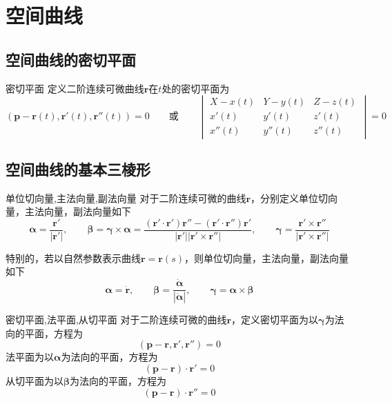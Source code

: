 \documentclass[lang = cn, scheme = chinese, thmcnt = section]{elegantbook}
\newcommand{\bs}{\boldsymbol}          %
\begin{document}
\section{空间曲线}

\subsection{空间曲线的密切平面}

\begin{definition}{密切平面}
	定义二阶连续可微曲线$\bs{r}$在$t$处的密切平面为
	$$
	(\bs{p}-\bs{r}(t),\bs{r}'(t),\bs{r}''(t))=0
	\qquad\text{或}\qquad
	\begin{vmatrix}
		X-x(t) & Y-y(t) & Z-z(t)\\
		x'(t) & y'(t) & z'(t)\\
		x''(t) & y''(t) & z''(t)
	\end{vmatrix}=0
	$$
\end{definition}

\subsection{空间曲线的基本三棱形}

\begin{definition}{单位切向量,主法向量,副法向量}
	对于二阶连续可微的曲线$\bs{r}$，分别定义单位切向量，主法向量，副法向量如下
	$$
	\bs{\alpha}=\frac{\bs{r}'}{|\bs{r}'|},\qquad
	\bs{\beta}=\bs{\gamma}\times\bs{\alpha}=\frac{(\bs{r}'\cdot\bs{r}')\bs{r}''-(\bs{r}'\cdot\bs{r}'')\bs{r}'}{|\bs{r}'||\bs{r}'\times \bs{r}''|},\qquad
	\bs{\gamma}=\frac{\bs{r}'\times \bs{r}''}{|\bs{r}'\times \bs{r}''|}
	$$
	
	特别的，若以自然参数表示曲线$\bs{r}=\bs{r}(s)$，则单位切向量，主法向量，副法向量如下
	$$
	\bs{\alpha}=\dot{\bs{r}},\qquad 
	\bs{\beta}=\frac{\dot{\bs{\alpha}}}{|\dot{\bs{\alpha}}|},\qquad 
	\bs{\gamma}=\bs{\alpha}\times\bs{\beta}
	$$
\end{definition}

\begin{definition}{密切平面,法平面,从切平面}
	对于二阶连续可微的曲线$\bs{r}$，定义密切平面为以$\bs{\gamma}$为法向的平面，方程为
	$$
	(\bs{p}-\bs{r},\bs{r}',\bs{r}'')=0
	$$
	法平面为以$\bs{\alpha}$为法向的平面，方程为
	$$
	(\bs{p}-\bs{r})\cdot \bs{r}'=0
	$$
	从切平面为以$\bs{\beta}$为法向的平面，方程为
	$$
	(\bs{p}-\bs{r})\cdot \bs{r}''=0
	$$
\end{definition}
\end{document}
